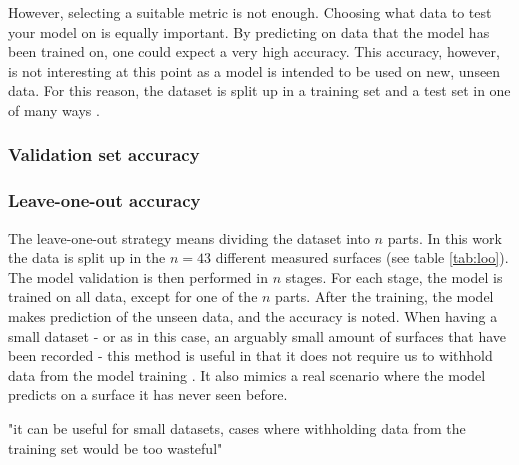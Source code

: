 However, selecting a suitable metric is not enough. Choosing what data to test your model on is equally important. By predicting on data that the model has been trained on, one could expect a very high accuracy. This accuracy, however, is not interesting at this point as a model is intended to be used on new, unseen data. For this reason, the dataset is split up in a training set and a test set in one of many ways \citep{raschka}.


\subsubsection{Validation set accuracy}


\subsubsection{Leave-one-out accuracy}
The leave-one-out strategy means dividing the dataset into $n$ parts. In this work the data is split up in the $n=43$ different measured surfaces (see table \ref{tab:loo}). The model validation is then performed in $n$ stages. For each stage, the model is trained on all data, except for one of the $n$ parts. After the training, the model makes prediction of the unseen data, and the accuracy is noted. When having a small dataset - or as in this case, an arguably small amount of surfaces that have been recorded - this method is useful in that it does not require us to withhold data from the model training \citep{raschka}. It also mimics a real scenario where the model predicts on a surface it has never seen before.

"it can be useful for small datasets, cases where withholding data from the training set would be too wasteful" \citep{raschka}










